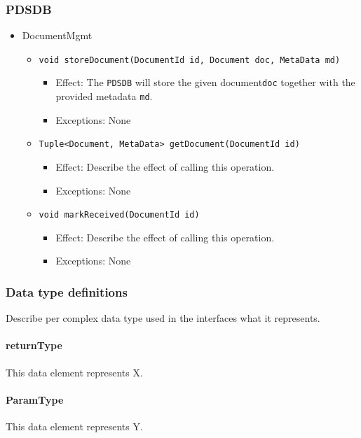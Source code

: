\documentclass[a4paper,10pt]{article}
\begin{document}
\subsubsection*{PDSDB}
\begin{itemize}
    \item DocumentMgmt
    \begin{itemize}
        \item \texttt{void storeDocument(DocumentId id, Document doc, MetaData md)}
        \begin{itemize}
            \item Effect: The \texttt{PDSDB} will store the given document\texttt{doc} together with the provided metadata \texttt{md}.
            \item Exceptions:  None 
        \end{itemize}

        \item \texttt{Tuple<Document, MetaData> getDocument(DocumentId id)}
        \begin{itemize}
            \item Effect: Describe the effect of calling this operation.
            \item Exceptions: None
         \end{itemize}
         
         \item \texttt{void markReceived(DocumentId id)}
        \begin{itemize}
            \item Effect: Describe the effect of calling this operation.
            \item Exceptions: None
         \end{itemize}
    \end{itemize}
\end{itemize}

\subsubsection{Data type definitions}
Describe per complex data type used in the interfaces what it represents.

\paragraph{returnType} This data element represents X.

\paragraph{ParamType} This data element represents Y.
\end{document}
